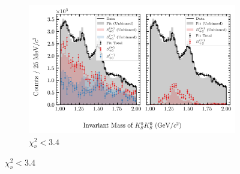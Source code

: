 \begin{figure}[htbp]
    \begin{subfigure}{0.8\textwidth}
        \includegraphics[width=\linewidth]{figures/binned_and_unbinned_fit_chisqdof_3.4_splot_D_1s_2b_phase_factor_waves29099_uncertainty_bootstrap-SE.png}
        \caption{$\chi^2_\nu < 3.4$}
    \end{subfigure}

    \vspace{1em}


\end{figure}
